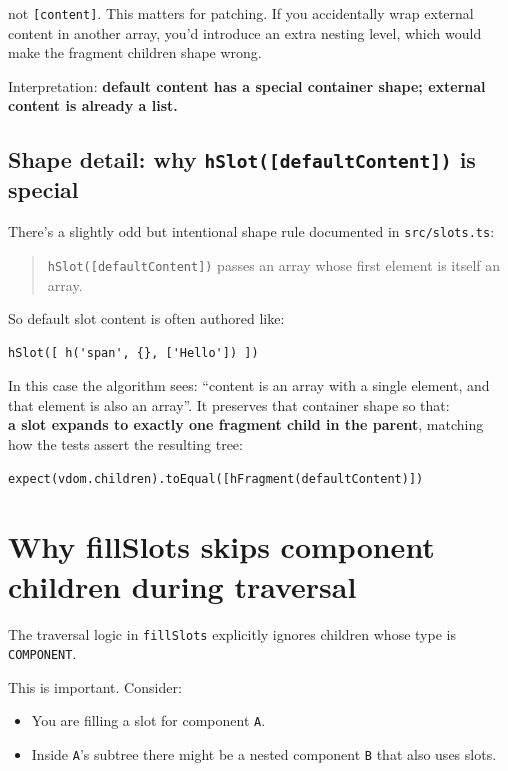 not \texttt{[content]}. This matters for patching.
If you accidentally wrap external content in another array, you'd introduce an extra nesting level, which would make the fragment children shape wrong.

Interpretation:
	\textbf{default content has a special container shape; external content is already a list.}

\subsection{Shape detail: why \texttt{hSlot([defaultContent])} is special}

There’s a slightly odd but intentional shape rule documented in \texttt{src/slots.ts}:

\begin{quote}
\texttt{hSlot([defaultContent])} passes an array whose first element is itself an array.
\end{quote}

So default slot content is often authored like:

\begin{verbatim}
hSlot([ h('span', {}, ['Hello']) ])
\end{verbatim}

In this case the algorithm sees: ``content is an array with a single element, and that element is also an array''.
It preserves that container shape so that:\\
	\textbf{a slot expands to exactly one fragment child in the parent}, matching how the tests assert the resulting tree:

\begin{verbatim}
expect(vdom.children).toEqual([hFragment(defaultContent)])
\end{verbatim}

\section{Why fillSlots skips component children during traversal}

The traversal logic in \texttt{fillSlots} explicitly ignores children whose type is \texttt{COMPONENT}.

This is important. Consider:

\begin{itemize}
  \item You are filling a slot for component \texttt{A}.
  \item Inside \texttt{A}'s subtree there might be a nested component \texttt{B} that also uses slots.
\end{itemize}

